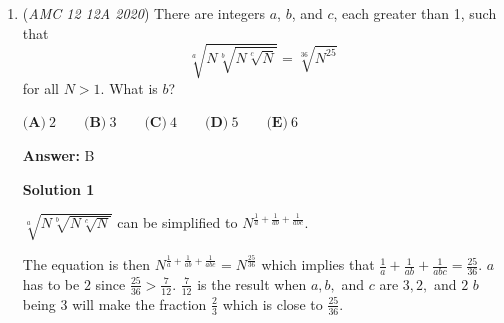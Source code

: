 \begin{enumerate}
 



\textbf{Solution 7 (Complex Numbers)}

Converting to the complex plane, we can see that two numbers on the line are $8i$ and $5+11i$. Translating $20+20i$ to the origin, we get $8i-20-20i = -20-12i$ and $5+11i-20-20i = -15-9i$. Multiplying each of them by $e^{\pi i/4}$, we get $-4\sqrt 2 - 16 \sqrt2 i$ and $-3\sqrt 2 - 12 \sqrt 2 i$. This line has a slope of $4$. Now, back to the cartesian plane. We have a line passing through $(20, 20)$ with slope $4$ which gives the equation as $y = 4x-60$ which implies the $x$ coordinate of the $x$ intercept is $60/4 = 15$.

 



\textbf{Solution 8 (quick)}

A quick check tells us that $(20,20)$ falls on the given line. Common sense tells us that if the slope of the original line is $1$, or 45 degrees from the horizontal, a 45 counter clockwise rotation will result in a vertical line, and the x-intercept will be $(20,0)$. Thinking of a 45 degree counter clockwise rotation as a 90 degree counter clockwise rotation that is bisected will helps in visualizing this line of reasoning.Therefore, it follows that if the original line is made steeper, then the x-intercept will move away from $(20,0)$ to the right. If the original line is made lower, then the opposite will happen. Our given line has slope $3/5$, so the answer must be $A$ or $B$. $A$ can be eliminated because an x-intercept of $(10,0)$ can only occur when the original line is horizontal. In conclusion, the answer must be $\boxed{\textbf{(B) }15}$.

 


	\item (\textit{AMC 12 12A 2020}) There are integers $a$, $b$, and $c$, each greater than 1, such that
 \[\sqrt[a]{N \sqrt[b]{N \sqrt[c]{N}}} = \sqrt[36]{N^{25}}\]for all $N > 1$. What is $b$?


 $\textbf{(A)}\ 2\qquad\textbf{(B)}\ 3\qquad\textbf{(C)}\ 4\qquad\textbf{(D)}\ 5\qquad\textbf{(E)}\ 6$

 \textbf{Answer: }B



\textbf{Solution 1}

$\sqrt[a]{N\sqrt[b]{N\sqrt[c]{N}}}$ can be simplified to $N^{\frac{1}{a}+\frac{1}{ab}+\frac{1}{abc}}.$

 The equation is then $N^{\frac{1}{a}+\frac{1}{ab}+\frac{1}{abc}}=N^{\frac{25}{36}}$ which implies that $\frac{1}{a}+\frac{1}{ab}+\frac{1}{abc}=\frac{25}{36}.$
$a$ has to be $2$ since $\frac{25}{36}>\frac{7}{12}$. $\frac{7}{12}$ is the result when $a, b,$ and $c$ are $3, 2,$ and $2$
$b$ being $3$ will make the fraction $\frac{2}{3}$ which is close to $\frac{25}{36}$. 


\end{enumerate}
